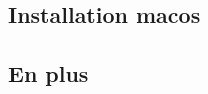 \subsection[Installation Mac]{Installation macos \label{sec:installation_macos}}

\subsection{En plus\label{sec:suite_installation}}

